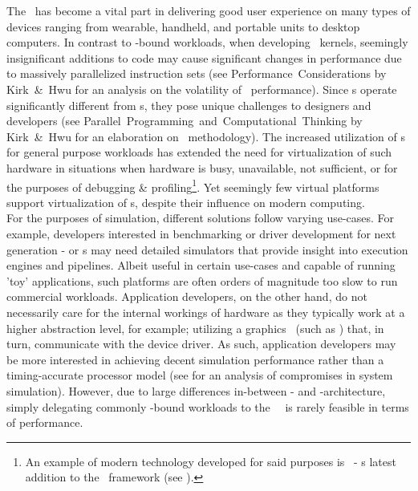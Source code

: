 \noindent
The \dvttermgpu\ has become a vital part in delivering good user experience on many types of devices ranging from wearable, handheld, and portable units to desktop computers.
In contrast to \dvttermcpu -bound workloads, when developing \dvttermgpu\ kernels, seemingly insignificant additions to code may cause significant changes in performance due to massively parallelized instruction sets (see Performance~Considerations by Kirk~\&~Hwu for an analysis on the volatility of \dvttermgpu\ performance).
Since \dvttermgpu s operate significantly different from \dvttermcpu s, they pose unique challenges to designers and developers (see Parallel~Programming~and~Computational~Thinking by Kirk~\&~Hwu for an elaboration on \dvttermgpgpu\ methodology).
The increased utilization of \dvttermgpu s for general purpose workloads has extended the need for virtualization of such hardware in situations when hardware is busy, unavailable, not sufficient, or for the purposes of debugging \& profiling\footnote{An example of modern technology developed for said purposes is \dvttermwarp\ - \dvttermmicrosoft s latest addition to the \dvttermdirectx\ framework (see ).}.
Yet seemingly few virtual platforms support virtualization of \dvttermgpu s, despite their influence on modern computing.\\

\noindent
For the purposes of simulation, different solutions follow varying use-cases. For example, developers interested in benchmarking or driver development for next generation \dvttermgpu - or \dvttermcpu s may need detailed simulators that provide insight into execution engines and pipelines.
Albeit useful in certain use-cases and capable of running 'toy' applications, such platforms are often orders of magnitude too slow to run commercial workloads.
Application developers, on the other hand, do not necessarily care for the internal workings of hardware as they typically work at a higher abstraction level, for example; utilizing a graphics \dvttermapi\ (such as \dvttermopengl ) that, in turn, communicate with the device driver.
As such, application developers may be more interested in achieving decent simulation performance rather than a timing-accurate processor model (see  for an analysis of compromises in system simulation).
However, due to large differences in-between \dvttermcpu - and \dvttermgpu -architecture, simply delegating commonly \dvttermgpu -bound workloads to the \dvttermhost\ \dvttermcpu\ is rarely feasible in terms of performance.

